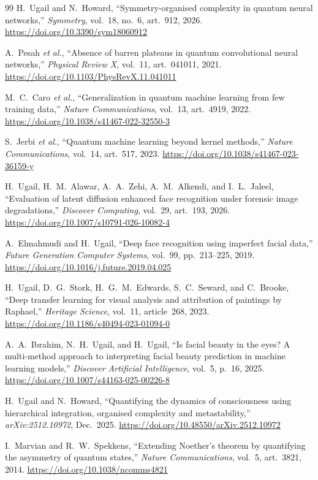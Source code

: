 \documentclass{article}
\begin{document}
\begin{thebibliography}{99}
H.~Ugail and N.~Howard, ``Symmetry-organised complexity in quantum neural networks,'' \emph{Symmetry}, vol.~18, no.~6, art.~912, 2026. \url{https://doi.org/10.3390/sym18060912}

A.~Pesah \emph{et al.}, ``Absence of barren plateaus in quantum convolutional neural networks,'' \emph{Physical Review X}, vol.~11, art.~041011, 2021. \url{https://doi.org/10.1103/PhysRevX.11.041011}

M.~C.~Caro \emph{et al.}, ``Generalization in quantum machine learning from few training data,'' \emph{Nature Communications}, vol.~13, art.~4919, 2022. \url{https://doi.org/10.1038/s41467-022-32550-3}

S.~Jerbi \emph{et al.}, ``Quantum machine learning beyond kernel methods,'' \emph{Nature Communications}, vol.~14, art.~517, 2023. \url{https://doi.org/10.1038/s41467-023-36159-y}

H.~Ugail, H.~M.~Alawar, A.~A.~Zehi, A.~M.~Alkendi, and I.~L.~Jaleel,
``Evaluation of latent diffusion enhanced face recognition under forensic
image degradations,'' \emph{Discover Computing}, vol.~29, art.~193, 2026.
\url{https://doi.org/10.1007/s10791-026-10082-4}

A.~Elmahmudi and H.~Ugail,
``Deep face recognition using imperfect facial data,''
\emph{Future Generation Computer Systems}, vol.~99, pp.~213--225, 2019. \url{https://doi.org/10.1016/j.future.2019.04.025}

H.~Ugail, D.~G.~Stork, H.~G.~M.~Edwards, S.~C.~Seward, and C.~Brooke,
``Deep transfer learning for visual analysis and attribution of paintings
by Raphael,'' \emph{Heritage Science}, vol.~11, article~268, 2023. \url{https://doi.org/10.1186/s40494-023-01094-0}

A.~A.~Ibrahim, N.~H.~Ugail, and H.~Ugail,
``Is facial beauty in the eyes? A multi-method approach to interpreting
facial beauty prediction in machine learning models,''
\emph{Discover Artificial Intelligence}, vol.~5, p.~16, 2025. \url{https://doi.org/10.1007/s44163-025-00226-8}

H.~Ugail and N.~Howard, ``Quantifying the dynamics of consciousness using
hierarchical integration, organised complexity and metastability,''
\emph{arXiv:2512.10972}, Dec.~2025. \url{https://doi.org/10.48550/arXiv.2512.10972}

I.~Marvian and R.~W.~Spekkens, ``Extending Noether's theorem by quantifying the asymmetry of quantum states,'' \emph{Nature Communications}, vol.~5, art.~3821, 2014. \url{https://doi.org/10.1038/ncomms4821}


\end{thebibliography}
\end{document}
